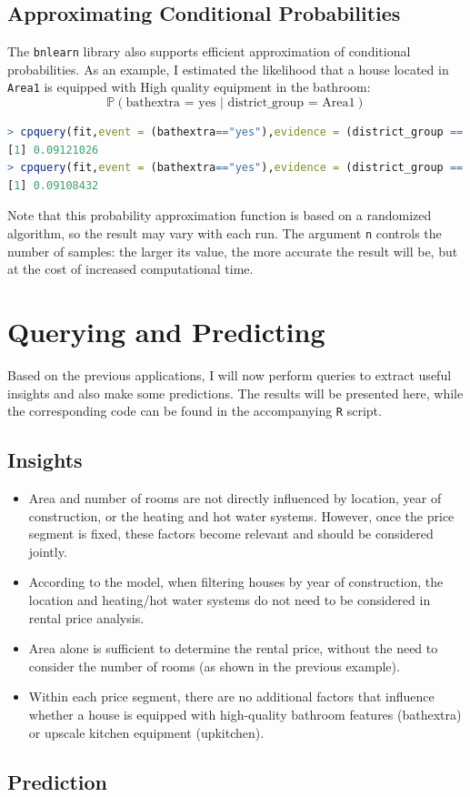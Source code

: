 \documentclass[15pt,a4paper]{report}
\begin{document}
\subsection*{Approximating Conditional Probabilities}
The \lstinline[language=R]|bnlearn| library also supports efficient approximation of conditional probabilities. As an example, I estimated the likelihood that a house located in \lstinline[language=R]|Area1| is equipped with High quality equipment in the bathroom:
\[
\mathbb{P}(\text{bathextra = yes | district\_group = Area1})
\]
\begin{lstlisting}[language=R]
> cpquery(fit,event = (bathextra=="yes"),evidence = (district_group == "Area1"),n=10^6)
[1] 0.09121026
> cpquery(fit,event = (bathextra=="yes"),evidence = (district_group == "Area1"),n=10^6)
[1] 0.09108432
\end{lstlisting}
Note that this probability approximation function is based on a randomized algorithm, so the result may vary with each run.
The argument \lstinline[language=R]|n|  controls the number of samples: the larger its value, the more accurate the result will be, but at the cost of increased computational time.

\section*{Querying and Predicting}
Based on the previous applications, I will now perform queries to extract useful insights and also make some predictions.
The results will be presented here, while the corresponding code can be found in the accompanying \lstinline[language=R]|R| script.
\subsection*{Insights}
\begin{itemize}
	\item Area and number of rooms are not directly influenced by location, year of construction, or the heating and hot water systems. However, once the price segment is fixed, these factors become relevant and should be considered jointly.
	\item According to the model, when filtering houses by year of construction, the location and heating/hot water systems do not need to be considered in rental price analysis.
	\item Area alone is sufficient to determine the rental price, without the need to consider the number of rooms (as shown in the previous example).
	\item Within each price segment, there are no additional factors that influence whether a house is equipped with high-quality bathroom features (bathextra) or upscale kitchen equipment (upkitchen).
\end{itemize}
\subsection*{Prediction}
\end{document}
